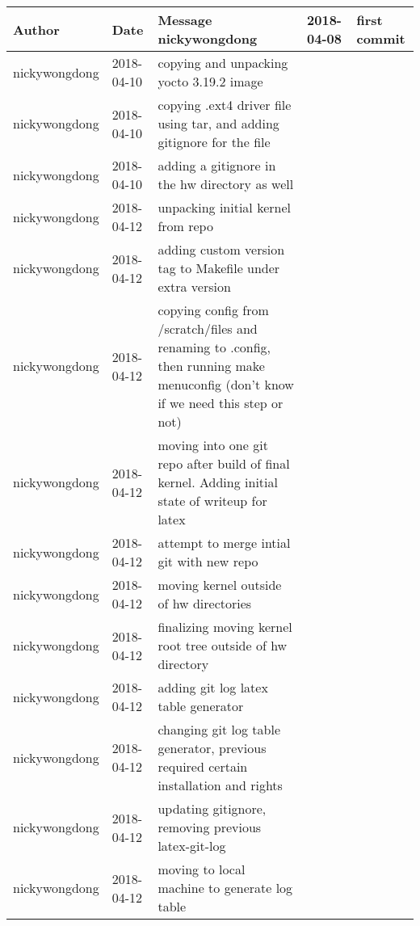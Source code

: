 \begin{center}
\begin{longtabu} to \textwidth {|
    X[4,l]|
    X[3,c]|
    X[8,l]|}
    \hline
    \textbf{Author} & \textbf{Date} & \textbf{Message} \ \hline
nickywongdong & 2018-04-08 & first commit \\ \hline
nickywongdong & 2018-04-10 & copying and unpacking yocto 3.19.2 image \\ \hline
nickywongdong & 2018-04-10 & copying .ext4 driver file using tar, and adding gitignore for the file \\ \hline
nickywongdong & 2018-04-10 & adding a gitignore in the hw directory as well \\ \hline
nickywongdong & 2018-04-12 & unpacking initial kernel from repo \\ \hline
nickywongdong & 2018-04-12 & adding custom version tag to Makefile under extra version \\ \hline
nickywongdong & 2018-04-12 & copying config from /scratch/files and renaming to .config, then running make menuconfig (don't know if we need this step or not) \\ \hline
nickywongdong & 2018-04-12 & moving into one git repo after build of final kernel. Adding initial state of writeup for latex \\ \hline
nickywongdong & 2018-04-12 & attempt to merge intial git with new repo \\ \hline
nickywongdong & 2018-04-12 & moving kernel outside of hw directories \\ \hline
nickywongdong & 2018-04-12 & finalizing moving kernel root tree outside of hw directory \\ \hline
nickywongdong & 2018-04-12 & adding git log latex table generator \\ \hline
nickywongdong & 2018-04-12 & changing git log table generator, previous required certain installation and rights \\ \hline
nickywongdong & 2018-04-12 & updating gitignore, removing previous latex-git-log \\ \hline
nickywongdong & 2018-04-12 & moving to local machine to generate log table \\ \hline
\end{longtabu}
\end{center}
